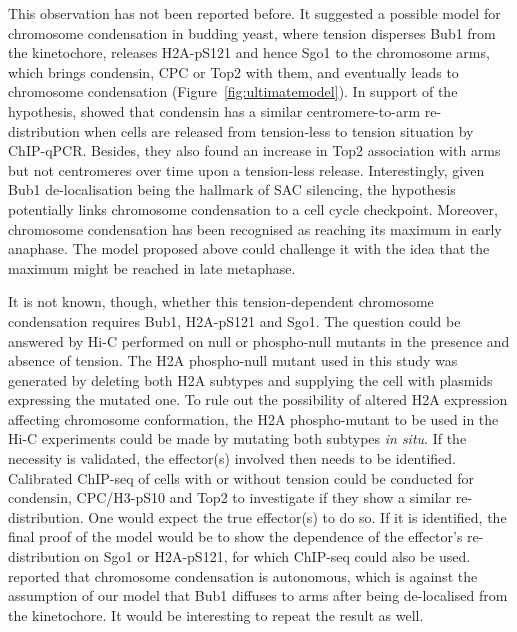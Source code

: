 This observation has not been reported before. It suggested a possible model for chromosome condensation in budding yeast, where tension disperses Bub1 from the kinetochore, releases H2A-pS121 and hence Sgo1 to the chromosome arms, which brings condensin, CPC or Top2 with them, and eventually leads to chromosome condensation (Figure~\ref{fig:ultimatemodel}). In support of the hypothesis, \cite{Leonard2015} showed that condensin has a similar centromere-to-arm re-distribution when cells are released from tension-less to tension situation by ChIP-qPCR. Besides, they also found an increase in Top2 association with arms but not centromeres over time upon a tension-less release. Interestingly, given Bub1 de-localisation being the hallmark of SAC silencing, the hypothesis potentially links chromosome condensation to a cell cycle checkpoint. Moreover, chromosome condensation has been recognised as reaching its maximum in early anaphase\cite{Antonin2016ChromosomeMitosis}. The model proposed above could challenge it with the idea that the maximum might be reached in late metaphase. 

It is not known, though, whether this tension-dependent chromosome condensation requires Bub1, H2A-pS121 and Sgo1. The question could be answered by Hi-C performed on null or phospho-null mutants in the presence and absence of tension. The H2A phospho-null mutant used in this study was generated by deleting both H2A subtypes and supplying the cell with plasmids expressing the mutated one. To rule out the possibility of altered H2A expression affecting chromosome conformation, the H2A phospho-mutant to be used in the Hi-C experiments could be made by mutating both subtypes \textit{in situ}. If the necessity is validated, the effector(s) involved then needs to be identified. Calibrated ChIP-seq of cells with or without tension could be conducted for condensin, CPC/H3-pS10 and Top2 to investigate if they show a similar re-distribution. One would expect the true effector(s) to do so. If it is identified, the final proof of the model would be to show the dependence of the effector's re-distribution on Sgo1 or H2A-pS121, for which ChIP-seq could also be used. \cite{Kruitwagen2015} reported that chromosome condensation is autonomous, which is against the assumption of our model that Bub1 diffuses to arms after being de-localised from the kinetochore. It would be interesting to repeat the result as well. 

